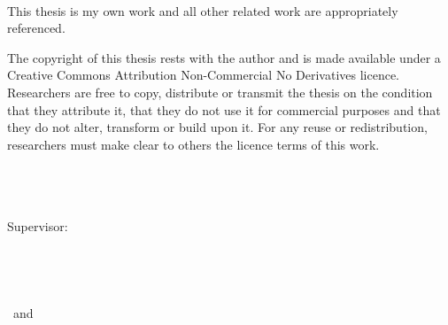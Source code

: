 {%
    \thispagestyle{plain}
    ~

    This thesis is my own work and all other related work are appropriately
    referenced.

    The copyright of this thesis rests with the author and is made
    available under a Creative Commons Attribution Non-Commercial No
    Derivatives licence. Researchers are free to copy, distribute or
    transmit the thesis on the condition that they attribute it, that
    they do not use it for commercial purposes and that they do not
    alter, transform or build upon it. For any reuse or redistribution,
    researchers must make clear to others the licence terms of this work.
}
\hfill
\vfill
{
    \small
    \textbf{\thesisName} \\
    \textit{\thesisTitle} \\
    \thesisDate \\
    Supervisor: \thesisFirstSupervisor%
    \\[1.5em]
    \textbf{\thesisUniversity} \\
    \textit{\thesisUniversityGroup} \\
    \thesisUniversityDepartment \\
    \thesisUniversityStreetAddress \\
    \thesisUniversityPostalCode\ and \thesisUniversityCity
}
